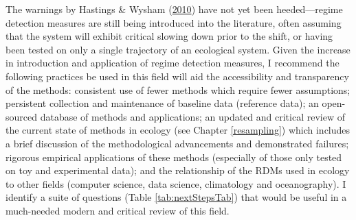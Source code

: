 \documentclass[print]{nuthesis}
\begin{document}
The warnings by Hastings \& Wysham (\protect\hyperlink{ref-hastings2010regime}{2010}) have not yet been heeded---regime detection measures are still being introduced into the literature, often assuming that the system will exhibit critical slowing down prior to the shift, or having been tested on only a single trajectory of an ecological system. Given the increase in introduction and application of regime detection measures, I recommend the following practices be used in this field will aid the accessibility and transparency of the methods: consistent use of fewer methods which require fewer assumptions; persistent collection and maintenance of baseline data (reference data); an open-sourced database of methods and applications; an updated and critical review of the current state of methods in ecology (see Chapter \ref{resampling}) which includes a brief discussion of the methodological advancements and demonstrated failures; rigorous empirical applications of these methods (especially of those only tested on toy and experimental data); and the relationship of the RDMs used in ecology to other fields (computer science, data science, climatology and oceanography). I identify a suite of questions (Table \ref{tab:nextStepsTab}) that would be useful in a much-needed modern and critical review of this field.
\end{document}
